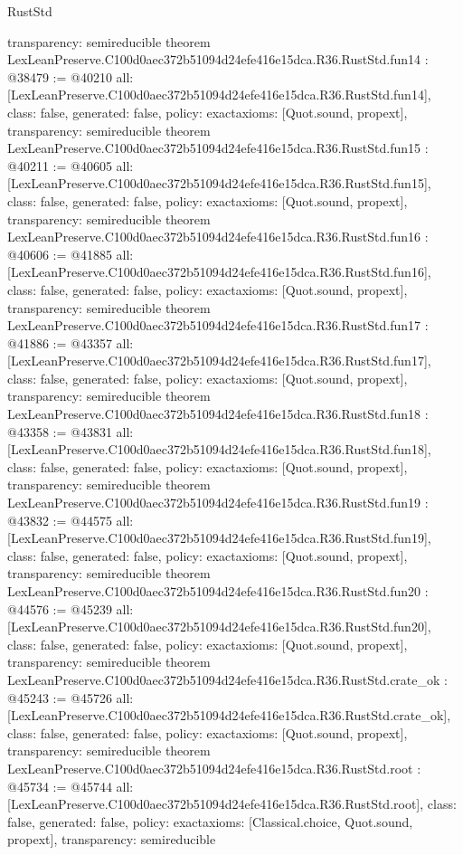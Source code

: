 \begin{lexlean}{RustStd}
\begin{coremodule}
{  transparency: semireducible
}
theorem LexLeanPreserve.C100d0aec372b51094d24efe416e15dca.R36.RustStd.fun14 : @38479 := @40210 {
  all: [LexLeanPreserve.C100d0aec372b51094d24efe416e15dca.R36.RustStd.fun14],
  class: false,
  generated: false,
  policy: exact{axioms: [Quot.sound, propext]},
  transparency: semireducible
}
theorem LexLeanPreserve.C100d0aec372b51094d24efe416e15dca.R36.RustStd.fun15 : @40211 := @40605 {
  all: [LexLeanPreserve.C100d0aec372b51094d24efe416e15dca.R36.RustStd.fun15],
  class: false,
  generated: false,
  policy: exact{axioms: [Quot.sound, propext]},
  transparency: semireducible
}
theorem LexLeanPreserve.C100d0aec372b51094d24efe416e15dca.R36.RustStd.fun16 : @40606 := @41885 {
  all: [LexLeanPreserve.C100d0aec372b51094d24efe416e15dca.R36.RustStd.fun16],
  class: false,
  generated: false,
  policy: exact{axioms: [Quot.sound, propext]},
  transparency: semireducible
}
theorem LexLeanPreserve.C100d0aec372b51094d24efe416e15dca.R36.RustStd.fun17 : @41886 := @43357 {
  all: [LexLeanPreserve.C100d0aec372b51094d24efe416e15dca.R36.RustStd.fun17],
  class: false,
  generated: false,
  policy: exact{axioms: [Quot.sound, propext]},
  transparency: semireducible
}
theorem LexLeanPreserve.C100d0aec372b51094d24efe416e15dca.R36.RustStd.fun18 : @43358 := @43831 {
  all: [LexLeanPreserve.C100d0aec372b51094d24efe416e15dca.R36.RustStd.fun18],
  class: false,
  generated: false,
  policy: exact{axioms: [Quot.sound, propext]},
  transparency: semireducible
}
theorem LexLeanPreserve.C100d0aec372b51094d24efe416e15dca.R36.RustStd.fun19 : @43832 := @44575 {
  all: [LexLeanPreserve.C100d0aec372b51094d24efe416e15dca.R36.RustStd.fun19],
  class: false,
  generated: false,
  policy: exact{axioms: [Quot.sound, propext]},
  transparency: semireducible
}
theorem LexLeanPreserve.C100d0aec372b51094d24efe416e15dca.R36.RustStd.fun20 : @44576 := @45239 {
  all: [LexLeanPreserve.C100d0aec372b51094d24efe416e15dca.R36.RustStd.fun20],
  class: false,
  generated: false,
  policy: exact{axioms: [Quot.sound, propext]},
  transparency: semireducible
}
theorem LexLeanPreserve.C100d0aec372b51094d24efe416e15dca.R36.RustStd.crate_ok : @45243 := @45726 {
  all: [LexLeanPreserve.C100d0aec372b51094d24efe416e15dca.R36.RustStd.crate_ok],
  class: false,
  generated: false,
  policy: exact{axioms: [Quot.sound, propext]},
  transparency: semireducible
}
theorem LexLeanPreserve.C100d0aec372b51094d24efe416e15dca.R36.RustStd.root : @45734 := @45744 {
  all: [LexLeanPreserve.C100d0aec372b51094d24efe416e15dca.R36.RustStd.root],
  class: false,
  generated: false,
  policy: exact{axioms: [Classical.choice, Quot.sound, propext]},
  transparency: semireducible
}


\end{coremodule}
\end{lexlean}
